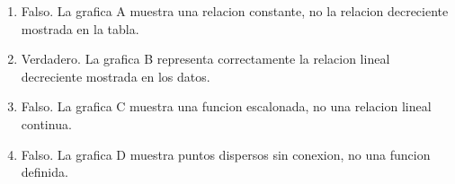 \documentclass[10pt,a4paper]{article}
\makeatletter
\newenvironment{solution}{\comment}{\endcomment}
\newenvironment{answerlist}{\renewcommand{\labelenumii}{(\alph{enumii})}\begin{enumerate}}{\end{enumerate}}
\newcommand{\exname}[1]{\def\@exname{#1}}
\newcommand{\extype}[1]{\def\@extype{#1}}
\newcommand{\exsolution}[1]{\def\@exsolution{#1}}
\newcommand{\exshuffle}[1]{\def\@exshuffle{#1}}
\newcommand{\exsection}[1]{\def\@exsection{#1}}
\makeatother
\begin{document}
\begin{enumerate}
\begin{solution}
\begin{answerlist}
  \item Falso. La grafica A muestra una relacion constante, no la relacion decreciente mostrada en la tabla.
  \item Verdadero. La grafica B representa correctamente la relacion lineal decreciente mostrada en los datos.
  \item Falso. La grafica C muestra una funcion escalonada, no una relacion lineal continua.
  \item Falso. La grafica D muestra puntos dispersos sin conexion, no una funcion definida.
\end{answerlist}
\end{solution}

\exname{Costo Boleta Original Interpretacion Representacion}
\extype{schoice}
\exsolution{0100}
\exshuffle{TRUE}
\exsection{Interpretacion y Representacion}

\end{enumerate}
\end{document}
